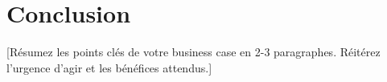 \section{Conclusion}

[Résumez les points clés de votre business case en 2-3 paragraphes. Réitérez l'urgence d'agir et les bénéfices attendus.]




